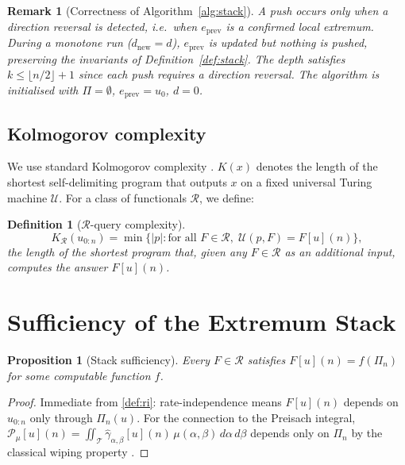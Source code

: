 \documentclass[preprint,12pt]{elsarticle}
\newtheorem{proposition}[theorem]{Proposition}
\newtheorem{definition}[theorem]{Definition}
\newtheorem{remark}[theorem]{Remark}
\newcommand{\T}{\mathcal{T}}
\newcommand{\R}{\mathcal{R}}
\newcommand{\stack}{\Pi}
\newcommand{\relay}[2]{\hat{\gamma}_{#1,#2}}
\begin{document}
\begin{remark}[Correctness of Algorithm~\ref{alg:stack}]
A push occurs only when a direction reversal is detected,
i.e.\ when $e_{\mathrm{prev}}$ is a \emph{confirmed} local extremum.
During a monotone run ($d_{\mathrm{new}} = d$), $e_{\mathrm{prev}}$
is updated but nothing is pushed, preserving the invariants
of Definition~\ref{def:stack}.
The depth satisfies $k \leq \lfloor n/2 \rfloor + 1$
since each push requires a direction reversal.
The algorithm is initialised with $\stack = \emptyset$,
$e_{\mathrm{prev}} = u_0$, $d = 0$.
\end{remark}

\subsection{Kolmogorov complexity}

We use standard Kolmogorov complexity \citep{LiVitanyi2008}.
$K(x)$ denotes the length of the shortest self-delimiting program
that outputs $x$ on a fixed universal Turing machine $\mathcal{U}$.
For a class of functionals $\R$, we define:

\begin{definition}[$\R$-query complexity]
\label{def:kR}
\[
  K_{\R}(u_{0:n})
  = \min\bigl\{|p| : \text{for all } F \in \R,\;
    \mathcal{U}(p, F) = F[u](n)\bigr\},
\]
the length of the shortest program that, given any $F \in \R$
as an additional input, computes the answer $F[u](n)$.
\end{definition}

\section{Sufficiency of the Extremum Stack}
\label{sec:sufficiency}

\begin{proposition}[Stack sufficiency]
\label{prop:suff}
Every $F \in \R$ satisfies $F[u](n) = f(\stack_n)$
for some computable function $f$.
\end{proposition}

\begin{proof}
Immediate from \cref{def:ri}: rate-independence means $F[u](n)$
depends on $u_{0:n}$ only through $\stack_n(u)$.
For the connection to the Preisach integral,
$\mathcal{P}_\mu[u](n) = \iint_{\T}
\relay{\alpha}{\beta}[u](n)\,\mu(\alpha,\beta)\,d\alpha\,d\beta$
depends only on $\stack_n$ by the classical wiping property
\citep{Mayergoyz1991}.
\end{proof}
\end{document}
